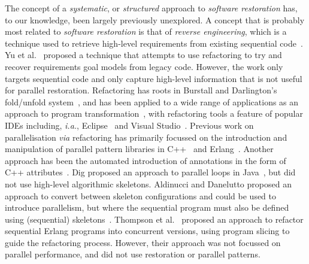 
The concept of a \emph{systematic}, or \emph{structured} approach to \emph{software restoration} has, to our knowledge, been largely previously unexplored. A concept that is probably most related to \emph{software restoration} is that of \emph{reverse engineering}, which is a technique used to retrieve high-level requirements from existing sequential code~\cite{10.1145/287000.287001,10.1145/337180.337234}. Yu et al.~\cite{10.1109/RE.2005.61} proposed a technique that attempts to use refactoring to try and recover requirements goal models from legacy code. However, the work only targets sequential code and only capture high-level information that is not useful for parallel restoration.
%
Refactoring has roots in Burstall and Darlington's fold/unfold system~\cite{darlington77}, and has been applied to a wide range of applications as an approach to program transformation~\cite{mens_refactoring}, with refactoring tools a feature of popular IDEs including, \textit{i.a.}, Eclipse~\cite{EclipseWeb} and Visual Studio~\cite{VisualStudioWeb}.
Previous work on parallelisation \textit{via} refactoring has primarily focussed on the introduction and manipulation of parallel pattern libraries in C++~\cite{brownagricultural,DBLP:conf/pdp/JanjicBMHDAG16} and Erlang~\cite{hlpp,DBLP:journals/cai/BarwellBHTB16}. Another approach
has been the automated introduction of annotations in the form of
C++ attributes~\cite{rio:2018}. Dig proposed an approach to parallel loops in Java~\cite{dig}, but did not use high-level algorithmic skeletons. Aldinucci and Danelutto proposed an approach to convert between skeleton configurations and could be used to introduce parallelism, but where the sequential program must also be defined using (sequential) skeletons~\cite{pdcs:nf:99}. Thompson et al.~\cite{10.1145/2678015.2682533} proposed an approach to refactor sequential Erlang programs into concurrent versions, using program slicing to guide the refactoring process. However, their approach was not focussed on parallel performance, and did not use restoration or parallel patterns.  
%
